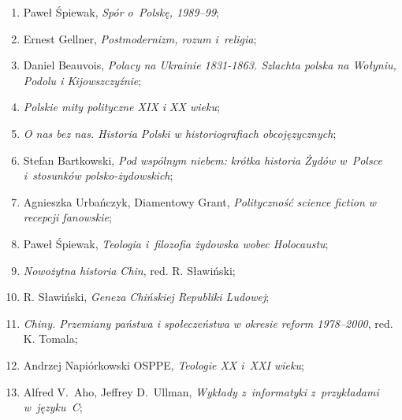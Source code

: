 \documentclass[a4paper,11pt]{article}
\begin{document}
\begin{enumerate}
\item Paweł Śpiewak, \textit{Spór o~Polskę, 1989--99};



\item Ernest Gellner, \textit{Postmodernizm, rozum i~religia};



\item Daniel Beauvois, \textit{Polacy na Ukrainie 1831-1863. Szlachta
    polska na Wołyniu, Podolu i Kijowszczyźnie};



\item \textit{Polskie mity polityczne XIX i XX wieku};



\item \textit{O nas bez nas. Historia Polski w historiografiach
    obcojęzycznych};



\item Stefan Bartkowski, \textit{Pod wspólnym niebem: krótka historia
    Żydów w~Polsce i~stosunków polsko-żydowskich};



\item Agnieszka Urbańczyk, Diamentowy Grant, \textit{Polityczność
    science fiction w recepcji fanowskie};



\item Paweł Śpiewak, \textit{Teologia i~filozofia żydowska wobec
    Holocaustu};



\item \textit{Nowożytna historia Chin}, red. R. Sławiński;



\item R. Sławiński, \textit{Geneza Chińskiej Republiki Ludowej};



\item \textit{Chiny. Przemiany państwa i społeczeństwa w okresie reform
    1978--2000}, red. K. Tomala;



\item Andrzej Napiórkowski OSPPE, \textit{Teologie XX i~XXI wieku};



\item Alfred V.~Aho, Jeffrey D.~Ullman, \textit{Wykłady z~informatyki
    z~przykładami w~języku~C};




\end{enumerate}
\end{document}
